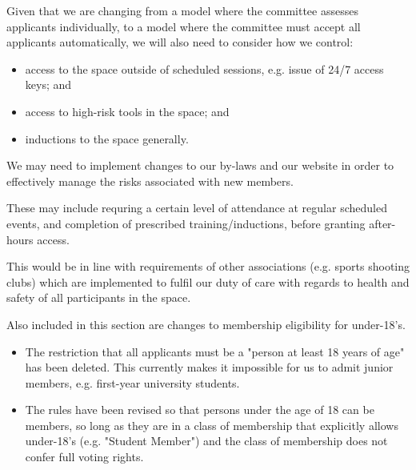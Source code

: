 \documentclass[../constitution.tex]{subfiles}
\begin{document}
\bigskip

Given that we are changing from a model where the committee assesses applicants individually, to a model where the committee must accept all applicants automatically, we will also need to consider how we control:

\begin{itemize}
    \item access to the space outside of scheduled sessions, e.g. issue of 24/7 access keys; and
    \item access to high-risk tools in the space; and
    \item inductions to the space generally.
\end{itemize}

\bigskip

We may need to implement changes to our by-laws and our website in order to effectively manage the risks associated with new members.

These may include requring a certain level of attendance at regular scheduled events, and completion of prescribed training/inductions, before granting after-hours access.

This would be in line with requirements of other associations (e.g. sports shooting clubs) which are implemented to fulfil our duty of care with regards to health and safety of all participants in the space.

\bigskip

Also included in this section are changes to membership eligibility for under-18's.

\begin{itemize}
    \item The restriction that all applicants must be a "person at least 18 years of age" has been deleted. This currently makes it impossible for us to admit junior members, e.g. first-year university students.

    \item The rules have been revised so that persons under the age of 18 can be members, so long as they are in a class of membership that explicitly allows under-18's (e.g. "Student Member") and the class of membership does not confer full voting rights.
\end{itemize}

\end{document}
